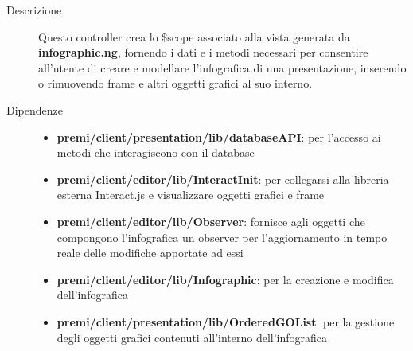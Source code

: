 \begin{description}
\item[Descrizione] \hfill
	Questo controller crea lo \$scope associato alla vista generata da \textbf{infographic.ng}, fornendo i dati e i metodi necessari per consentire all'utente di creare e modellare l'infografica di una presentazione, inserendo o rimuovendo frame e altri oggetti grafici al suo interno.
	
	
	
\item[Dipendenze] \hfill
	\begin{itemize}
		\item \textbf{premi/client/presentation/lib/databaseAPI}: per l'accesso ai metodi che interagiscono con il database
		\item \textbf{premi/client/editor/lib/InteractInit}: per collegarsi alla libreria esterna Interact.js e visualizzare oggetti grafici e frame
		\item \textbf{premi/client/editor/lib/Observer}: fornisce agli oggetti che compongono l'infografica un observer per l'aggiornamento in tempo reale delle modifiche apportate ad essi
		\item \textbf{premi/client/editor/lib/Infographic}: per la creazione e modifica dell'infografica
	\item \textbf{premi/client/presentation/lib/OrderedGOList}: per la gestione degli oggetti grafici contenuti all'interno dell'infografica
	\end{itemize}
	

\end{description}
